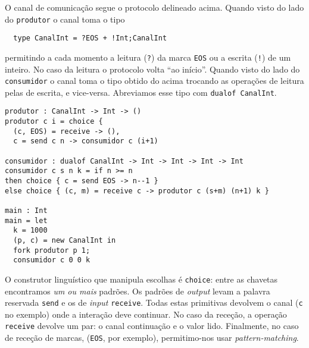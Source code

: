 O canal de comunicação segue o  protocolo delineado acima. Quando
visto do lado do \lstinline|produtor| o canal toma o tipo
%
\begin{lstlisting}
  type CanalInt = ?EOS + !Int;CanalInt
\end{lstlisting}
%
permitindo a cada momento a leitura (\lstinline|?|) da marca
\lstinline|EOS| ou a escrita (\lstinline|!|) de um inteiro. No caso da
leitura o protocolo volta ``ao início''.
%
Quando visto do lado do \lstinline|consumidor| o canal toma o tipo
obtido do acima trocando as operações de leitura pelas de escrita, e
vice-versa. Abreviamos esse tipo com \lstinline|dualof CanalInt|.

\begin{lstlisting}
produtor : CanalInt -> Int -> ()
produtor c i = choice {
  (c, EOS) = receive -> (),
  c = send c n -> consumidor c (i+1)

consumidor : dualof CanalInt -> Int -> Int -> Int -> Int
consumidor c s n k = if n >= n
then choice { c = send EOS -> n--1 }
else choice { (c, m) = receive c -> produtor c (s+m) (n+1) k }

main : Int
main = let
  k = 1000
  (p, c) = new CanalInt in
  fork produtor p 1;
  consumidor c 0 0 k
\end{lstlisting}

O construtor linguístico que manipula escolhas é \lstinline|choice|:
entre as chavetas encontramos \emph{um ou mais} padrões. Os padrões de
\textit{output} levam a palavra reservada \lstinline|send| e os de
\textit{input} \lstinline|receive|. Todas estas primitivas devolvem o
canal (\lstinline|c| no exemplo) onde a interação deve continuar. No
caso da receção, a operação \lstinline|receive| devolve um par: o
canal continuação e o valor lido. Finalmente, no caso de receção de
marcas, (\lstinline|EOS|, por exemplo), permitimo-nos usar
\textit{pattern-matching}.


